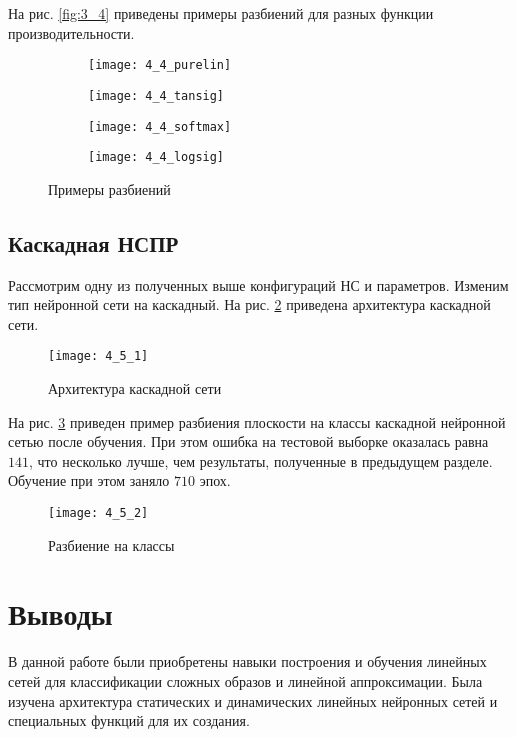 На рис. \ref{fig:3_4} приведены примеры разбиений для разных функции производительности.
\vspace{-1cm}
\begin{figure}[H]
\begin{center}
	\begin{subfigure}[b]{0.49\textwidth}
		\texttt{[image: 4\_4\_purelin]}
		\caption{}
	\end{subfigure}
	\begin{subfigure}[b]{0.49\textwidth}
		\texttt{[image: 4\_4\_tansig]}
		\caption{}
	\end{subfigure}
	\begin{subfigure}[b]{0.49\textwidth}
		\texttt{[image: 4\_4\_softmax]}
		\caption{}
	\end{subfigure}
	\begin{subfigure}[b]{0.49\textwidth}
		\texttt{[image: 4\_4\_logsig]}
		\caption{}
	\end{subfigure}
	\caption{Примеры разбиений}
	\label{fig:4_4}
\end{center}
\end{figure}

\subsection{Каскадная НСПР}

Рассмотрим одну из полученных выше конфигураций НС и параметров. Изменим тип нейронной сети на каскадный. На рис. \ref{fig:4_5_1} приведена архитектура каскадной сети.
\vspace{-0.5cm}
\begin{figure}[H]
\begin{center}
	\texttt{[image: 4\_5\_1]}
	\caption{Архитектура каскадной сети}
	\label{fig:4_5_1}
\end{center}
\end{figure}

\vspace{-0.5cm}
На рис. \ref{fig:4_5_2} приведен пример разбиения плоскости на классы каскадной нейронной сетью после обучения. При этом ошибка  на тестовой выборке оказалась равна $141$, что несколько лучше, чем результаты, полученные в предыдущем разделе. Обучение при этом заняло $710$ эпох.
\vspace{-0.5cm}
\begin{figure}[H]
\begin{center}
	\texttt{[image: 4\_5\_2]}
	\caption{Разбиение на классы}
	\label{fig:4_5_2}
\end{center}
\end{figure}
\vspace{-1cm}

\section{Выводы}

В данной работе были приобретены навыки построения и обучения линейных сетей для классификации сложных образов и линейной аппроксимации. Была изучена архитектура статических и динамических линейных нейронных сетей и специальных функций для их создания.


